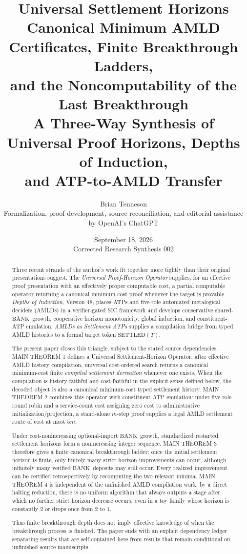 \documentclass[11pt]{article}
\title{\bfseries Universal Settlement Horizons\\[0.25em]
\large Canonical Minimum AMLD Certificates, Finite Breakthrough Ladders,\\
and the Noncomputability of the Last Breakthrough\\[0.5em]
\normalsize A Three-Way Synthesis of Universal Proof Horizons, Depths of Induction,\\
and ATP-to-AMLD Transfer}
\author{Brian Tenneson\\[0.35em]
\small Formalization, proof development, source reconciliation, and editorial assistance by OpenAI's ChatGPT}
\date{September 18, 2026\\\small Corrected Research Synthesis 002}
\theoremstyle{definition}
\newcommand{\BANK}{\ensuremath{\mathrm{BANK}}}
\newcommand{\SETTLED}{\ensuremath{\mathrm{SETTLED}}}
\begin{document}
\maketitle

\begin{abstract}
Three recent strands of the author's work fit together more tightly than their original presentations suggest. The \emph{Universal Proof-Horizon Operator} supplies, for an effective proof presentation with an effectively proper computable cost, a partial computable operator returning a canonical minimum-cost proof whenever the target is provable. \emph{Depths of Induction}, Version 48, places ATPs and five-role automated metalogical deciders (AMLDs) in a verifier-gated SIC framework and develops conservative shared-\BANK\ growth, cooperative horizon monotonicity, global induction, and constituent-ATP emulation. \emph{AMLDs as Settlement ATPs} supplies a compilation bridge from typed AMLD histories to a formal target token $\SETTLED(T)$.

The present paper closes this triangle, subject to the stated source dependencies. MAIN THEOREM 1 defines a Universal Settlement-Horizon Operator: after effective AMLD history compilation, universal cost-ordered search returns a canonical minimum-cost finite \emph{compiled settlement derivation} whenever one exists. When the compilation is history-faithful and cost-faithful in the explicit sense defined below, the decoded object is also a canonical minimum-cost typed settlement history. MAIN THEOREM 2 combines this operator with constituent-ATP emulation: under five-role round robin and a service-count cost assigning zero cost to administrative initialization/projection, a stand-alone $m$-step proof supplies a legal AMLD settlement route of cost at most $5m$.

Under cost-nonincreasing optional-import \BANK\ growth, standardized restarted settlement horizons form a nonincreasing integer sequence. MAIN THEOREM 3 therefore gives a finite canonical breakthrough ladder: once the initial settlement horizon is finite, only finitely many strict horizon improvements can occur, although infinitely many verified \BANK\ deposits may still occur. Every realized improvement can be certified retrospectively by recomputing the two relevant minima. MAIN THEOREM 4 is independent of the unfinished AMLD compilation work: by a direct halting reduction, there is no uniform algorithm that always outputs a stage after which no further strict horizon decrease occurs, even in a toy family whose horizon is constantly $2$ or drops once from $2$ to $1$.

Thus finite breakthrough depth does not imply effective knowledge of when the breakthrough process is finished. The paper ends with an explicit dependency ledger separating results that are self-contained here from results that remain conditional on unfinished source manuscripts.
\end{abstract}
\end{document}
